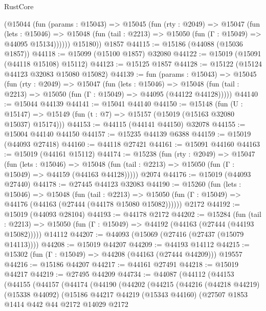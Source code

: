 \begin{lexlean}{RustCore}
\begin{coremodule}
        (@15044
          (fun (params : @15043) =>
          @15045
            (fun (rty : @2049) =>
            @15047
              (fun (lets : @15046) =>
              @15048 (fun (tail : @2213) => @15050 (fun (Γ : @15049) => @44095 @15134))))))
        @15180))
    @1857
@44115 := @15186 (@44088 (@15036 @1857))
@44118 := @15099 (@15100 @1857) @32080
@44122 := @15019 (@15091 (@44118 @15108) @15112)
@44123 := @15125 @1857
@44128 := @15122 (@15124 @44123 @32083 @15080 @15082)
@44139 := fun (params : @15043) =>
  @15045
    (fun (rty : @2049) =>
    @15047
      (fun (lets : @15046) =>
      @15048 (fun (tail : @2213) => @15050 (fun (Γ : @15049) => @44095 (@44122 @44128)))))
@44140 := @15044 @44139
@44141 := @15041 @44140
@44150 := @15148
    (fun (U : @15147) => @15149 (fun (t : @7) => @15157 (@15019 (@15163 @32080 @15037) @15174)))
@44153 := @44115 (@44141 @44150) @32078
@44155 := @15004 @44140 @44150
@44157 := @15235 @44139 @6388
@44159 := @15019 (@44093 @27418)
@44160 := @44118 @27421
@44161 := @15091 @44160
@44163 := @15019 (@44161 @15112)
@44174 := @15238
    (fun (rty : @2049) =>
    @15047
      (fun (lets : @15046) =>
      @15048 (fun (tail : @2213) => @15050 (fun (Γ : @15049) => @44159 (@44163 @44128)))))
    @2074
@44176 := @15019 (@44093 @27440)
@44178 := @27445 @44123 @32083
@44190 := @15260
    (fun (lets : @15046) =>
    @15048
      (fun (tail : @2213) =>
      @15050 (fun (Γ : @15049) => @44176 (@44163 (@27444 (@44178 @15080 @15082))))))
    @2172
@44192 := @15019 (@44093 @28104)
@44193 := @44178 @2172
@44202 := @15284
    (fun (tail : @2213) => @15050 (fun (Γ : @15049) => @44192 (@44163 (@27444 (@44193 @15082)))))
    @14112
@44207 := @44093 (@15069 (@27416 (@27437 (@15079 @14113))))
@44208 := @15019 @44207
@44209 := @44193 @14112
@44215 := @15302 (fun (Γ : @15049) => @44208 (@44163 (@27444 @44209))) @19557
@44216 := @15186 @44207
@44217 := @44161 @27491
@44218 := @15019 @44217
@44219 := @27495 @44209
@44734 := @44087
    (@44112
      (@44153
        (@44155
          (@44157
            (@44174
              (@44190
                (@44202
                  (@44215
                    (@44216
                      (@44218 @44219)
                      (@15338 @44092)
                      (@15186
                        @44217
                        @44219
                        (@15343 @44160)
                        (@27507
                          @1853
                          @1414
                          @442
                          @44
                          @2172
                          @14029
                          @2172

\end{coremodule}
\end{lexlean}
